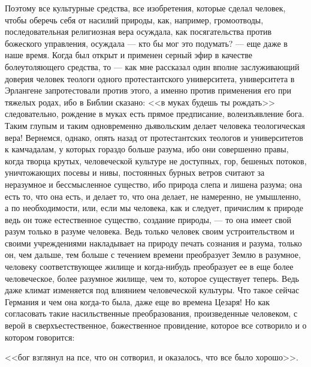 \documentclass[12pt]{article}
\begin{document}
Поэтому все культурные средства, все изобретения, которые сделал человек, чтобы оберечь себя от насилий природы, как, например, громоотводы, последовательная религиозная вера осуждала, как посягательства против божеского управления, осуждала --- кто бы мог это подумать? --- еще даже в наше время. Когда был открыт и применен серный эфир в качестве болеутоляющего средства, то --- как мне рассказал один вполне заслуживающий доверия человек теологи одного протестантского университета, университета в Эрлангене запротестовали против этого, а именно против применения его при тяжелых родах, ибо в Библии сказано: <<в муках будешь ты рождать>>  следовательно, рождение в муках есть прямое предписание, волеизъявление бога. Таким глупым и таким одновременно дьявольским делает человека теологическая вера! Вернемся, однако, опять назад от протестантских теологов и университетов к камчадалам, у которых гораздо больше разума, ибо они совершенно правы, когда творца крутых, человеческой культуре не доступных, гор, бешеных потоков, уничтожающих посевы и нивы, постоянных бурных ветров считают за неразумное и бессмысленное существо, ибо природа слепа и лишена разума; она есть то, что она есть, и делает то, что она делает, не намеренно, не умышленно, а по необходимости, или, если мы человека, как и следует, причислим к природе ведь он тоже естественное существо, создание природы, --- то она имеет свой разум только в разуме человека. Ведь только человек своим устроительством и своими учреждениями накладывает на природу печать сознания и разума, только он, чем дальше, тем больше с течением времени преобразует Землю в разумное, человеку соответствующее жилище и когда-нибудь преобразует ее в еще более человеческое, более разумное жилище, чем то, которое существует теперь. Ведь даже климат изменяется под влиянием человеческой культуры. Что такое сейчас Германия и чем она когда-то была, даже еще во времена Цезаря! Но как согласовать такие насильственные преобразования, произведенные человеком, с верой в сверхъестественное, божественное провидение, которое все сотворило и о котором говорится: 

<<бог взглянул на псе, что он сотворил, и оказалось, что все было хорошо>>. 
\end{document}

